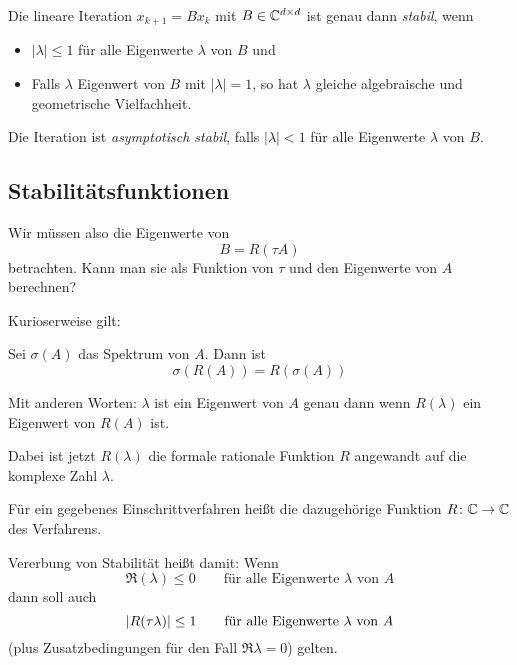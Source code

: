 \begin{satz}
	Die lineare Iteration $x_{k+1}=Bx_k$ mit $B \in \mathbb C^{d \times d}$ ist genau dann \textit{stabil}, wenn 
	\begin{itemize}
		\item $\left\vert \lambda \right\vert \leq 1$ für alle Eigenwerte $\lambda $ von $B$ und
		\item Falls $\lambda$ Eigenwert von $B$ mit $\left\vert \lambda \right\vert =1$, so hat $\lambda$ gleiche algebraische und geometrische Vielfachheit.
	\end{itemize}
	Die Iteration ist \textit{asymptotisch stabil}, falls $\left\vert \lambda \right\vert <1$ für alle Eigenwerte $\lambda$ von $B$.
\end{satz}


\subsection{Stabilitätsfunktionen}

Wir müssen also die Eigenwerte von
\begin{equation*}
	B = R(\tau A)
\end{equation*}
betrachten. Kann man sie als Funktion von $\tau$ und den Eigenwerte von $A$ berechnen?

Kurioserweise gilt:

\begin{satz}
\label{thm:spektrale_aequivarianz}
	Sei $\sigma(A)$ das Spektrum von $A$.  Dann ist
	\begin{equation*}
		\sigma(R(A)) = R(\sigma(A))
	\end{equation*}
\end{satz}
Mit anderen Worten: $\lambda$ ist ein Eigenwert von $A$ genau dann wenn $R(\lambda)$ ein Eigenwert von $R(A)$ ist.

Dabei ist jetzt $R(\lambda)$ die formale rationale Funktion $R$ angewandt auf die komplexe Zahl $\lambda$.

\begin{definition}
	Für ein gegebenes Einschrittverfahren heißt die dazugehörige Funktion $R \colon \mathbb C \to \mathbb C$  des Verfahrens.
\end{definition}

Vererbung von Stabilität heißt damit:  Wenn
\begin{equation*}
	\Re(\lambda) \le 0
	\qquad
	\text{für alle Eigenwerte $\lambda$ von $A$}
\end{equation*}
dann soll auch
\begin{equation*}
	\lvert R(\tau\lambda) \rvert \le 1
	\qquad
	\text{für alle Eigenwerte $\lambda$ von $A$}
\end{equation*}
(plus Zusatzbedingungen für den Fall $\Re \lambda = 0$) gelten.


